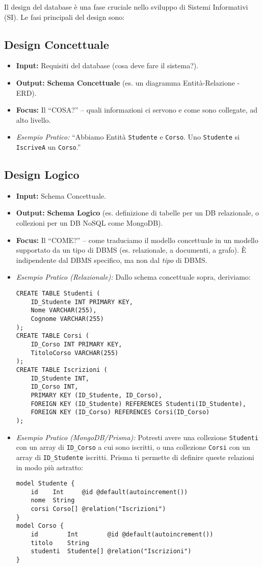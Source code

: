 \documentclass{article}
\begin{document}
	Il design del database è una fase cruciale nello sviluppo di Sistemi Informativi (SI). Le fasi principali del design sono:
	
	\subsection{Design Concettuale}
	\begin{itemize}
		\item \textbf{Input:} Requisiti del database (cosa deve fare il sistema?).
		\item \textbf{Output:} \textbf{Schema Concettuale} (es. un diagramma Entità-Relazione - ERD).
		\item \textbf{Focus:} Il ``COSA?'' – quali informazioni ci servono e come sono collegate, ad alto livello.
		\item \textit{Esempio Pratico:} ``Abbiamo Entità \texttt{Studente} e \texttt{Corso}. Uno \texttt{Studente} si \texttt{IscriveA} un \texttt{Corso}.''
	\end{itemize}
	
	\subsection{Design Logico}
	\begin{itemize}
		\item \textbf{Input:} Schema Concettuale.
		\item \textbf{Output:} \textbf{Schema Logico} (es. definizione di tabelle per un DB relazionale, o collezioni per un DB NoSQL come MongoDB).
		\item \textbf{Focus:} Il ``COME?'' – come traduciamo il modello concettuale in un modello supportato da un tipo di DBMS (es. relazionale, a documenti, a grafo). È indipendente dal DBMS specifico, ma non dal \textit{tipo} di DBMS.
		\item \textit{Esempio Pratico (Relazionale):} Dallo schema concettuale sopra, deriviamo:
		\begin{verbatim}
CREATE TABLE Studenti (
	ID_Studente INT PRIMARY KEY,
	Nome VARCHAR(255),
	Cognome VARCHAR(255)
);
CREATE TABLE Corsi (
	ID_Corso INT PRIMARY KEY,
	TitoloCorso VARCHAR(255)
);
CREATE TABLE Iscrizioni (
	ID_Studente INT,
	ID_Corso INT,
	PRIMARY KEY (ID_Studente, ID_Corso),
	FOREIGN KEY (ID_Studente) REFERENCES Studenti(ID_Studente),
	FOREIGN KEY (ID_Corso) REFERENCES Corsi(ID_Corso)
);
		\end{verbatim}
		\item \textit{Esempio Pratico (MongoDB/Prisma):} Potresti avere una collezione \texttt{Studenti} con un array di \texttt{ID\_Corso} a cui sono iscritti, o una collezione \texttt{Corsi} con un array di \texttt{ID\_Studente} iscritti. Prisma ti permette di definire queste relazioni in modo più astratto:
		\begin{verbatim}
model Studente {
	id    Int     @id @default(autoincrement())
	nome  String
	corsi Corso[] @relation("Iscrizioni")
}
model Corso {
	id        Int        @id @default(autoincrement())
	titolo    String
	studenti  Studente[] @relation("Iscrizioni")
}
		\end{verbatim}
	\end{itemize}
	
\end{document}
